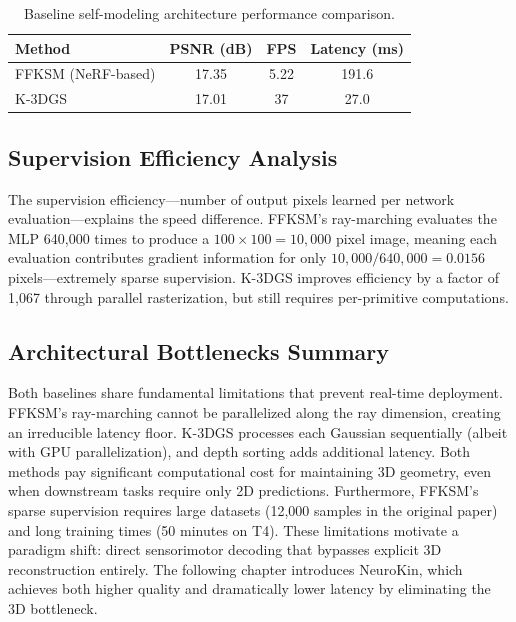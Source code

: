 \documentclass[12pt,a4paper,oneside]{report}
\begin{document}
\begin{table}[H]
\centering
\caption{Baseline self-modeling architecture performance comparison.}
\label{tab:baseline_comparison}
\begin{tabular}{lccc}
\toprule
\textbf{Method} & \textbf{PSNR (dB)} & \textbf{FPS} & \textbf{Latency (ms)} \\
\midrule
FFKSM (NeRF-based) & 17.35 & 5.22 & 191.6 \\
K-3DGS & 17.01 & 37 & 27.0 \\
\bottomrule
\end{tabular}
\end{table}

\subsection{Supervision Efficiency Analysis}
\label{subsec:supervision_efficiency_analysis}

The supervision efficiency—number of output pixels learned per network evaluation—explains the speed difference. FFKSM's ray-marching evaluates the MLP 640,000 times to produce a $100 \times 100 = 10,000$ pixel image, meaning each evaluation contributes gradient information for only $10,000 / 640,000 = 0.0156$ pixels—extremely sparse supervision. K-3DGS improves efficiency by a factor of 1,067 through parallel rasterization, but still requires per-primitive computations.

\subsection{Architectural Bottlenecks Summary}
\label{subsec:architectural_bottlenecks_summary}

Both baselines share fundamental limitations that prevent real-time deployment. FFKSM's ray-marching cannot be parallelized along the ray dimension, creating an irreducible latency floor. K-3DGS processes each Gaussian sequentially (albeit with GPU parallelization), and depth sorting adds additional latency. Both methods pay significant computational cost for maintaining 3D geometry, even when downstream tasks require only 2D predictions. Furthermore, FFKSM's sparse supervision requires large datasets (12,000 samples in the original paper) and long training times (50 minutes on T4). These limitations motivate a paradigm shift: direct sensorimotor decoding that bypasses explicit 3D reconstruction entirely. The following chapter introduces NeuroKin, which achieves both higher quality and dramatically lower latency by eliminating the 3D bottleneck.
\end{document}
